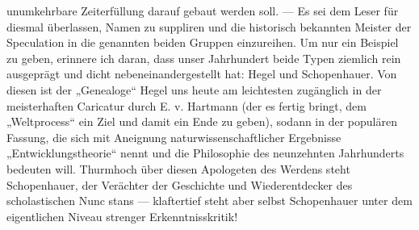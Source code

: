 unumkehrbare Zeiterfüllung darauf gebaut werden soll. — Es sei dem Leser für diesmal überlassen, Namen zu suppliren und die historisch bekannten Meister der Speculation in die genannten beiden Gruppen einzureihen. Um nur ein Beispiel zu geben, erinnere ich daran, dass unser Jahrhundert beide Typen ziemlich rein ausgeprägt und dicht nebeneinandergestellt hat: Hegel und Schopenhauer. Von diesen ist der „Genealoge“ Hegel uns heute am leichtesten zugänglich in der meisterhaften Caricatur durch E. v. Hartmann (der es fertig bringt, dem „Weltprocess“ ein Ziel und damit ein Ende zu geben), sodann in der populären Fassung, die sich mit Aneignung naturwissenschaftlicher Ergebnisse „Entwicklungstheorie“ nennt und die Philosophie des neunzehnten Jahrhunderts bedeuten will. Thurmhoch über diesen Apologeten des Werdens steht Schopenhauer, der Verächter der Geschichte und Wiederentdecker des scholastischen Nunc stans — klaftertief steht aber selbst Schopenhauer unter dem eigentlichen Niveau strenger Erkenntnisskritik!
\par

